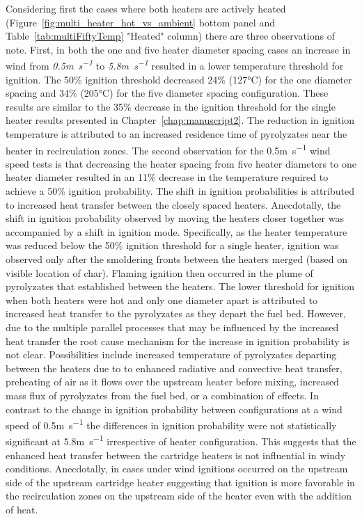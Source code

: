     Considering first the cases where both heaters are actively heated (Figure~\ref{fig:multi_heater_hot_vs_ambient} bottom panel and Table~\ref{tab:multiFiftyTemp} "Heated" column) there are three observations of note. First, in both the one and five heater diameter spacing cases an increase in wind from \textit{0.5\si{\meter\per\second}} to \textit{5.8\si{\meter\per\second}} resulted in a lower temperature threshold for ignition. The 50\% ignition threshold decreased 24\% (127\si{\celsius}) for the one diameter spacing and 34\% (205\si{\celsius}) for the five diameter spacing configuration. These results are similar to the 35\% decrease in the ignition threshold for the single heater results presented in Chapter~\ref{chap:manuscript2}. The reduction in ignition temperature is attributed to an increased residence time of pyrolyzates near the heater in recirculation zones. The second observation for the 0.5\si{\meter\per\second} wind speed tests is that decreasing the heater spacing from five heater diameters to one heater diameter resulted in an 11\% decrease in the temperature required to achieve a 50\% ignition probability. The shift in ignition probabilities is attributed to increased heat transfer between the closely spaced heaters. Anecdotally, the shift in ignition probability observed by moving the heaters closer together was accompanied by a shift in ignition mode. Specifically, as the heater temperature was reduced below the 50\% ignition threshold for a single heater, ignition was observed only after the smoldering fronts between the heaters merged (based on visible location of char). Flaming ignition then occurred in the plume of pyrolyzates that established between the heaters. The lower threshold for ignition when both heaters were hot and only one diameter apart is attributed to increased heat transfer to the pyrolyzates as they depart the fuel bed. However, due to the multiple parallel processes that may be influenced by the increased heat transfer the root cause mechanism for the increase in ignition probability is not clear.  Possibilities include increased temperature of pyrolyzates departing between the heaters due to to enhanced radiative and convective heat transfer, preheating of air as it flows over the upstream heater before mixing, increased mass flux of pyrolyzates from the fuel bed, or a combination of effects. In contrast to the change in ignition probability between configurations at a wind speed of 0.5\si{\meter\per\second} the differences in ignition probability were not statistically significant at 5.8\si{\meter\per\second} irrespective of heater configuration. This suggests that the enhanced heat transfer between the cartridge heaters is not influential in windy conditions. Anecdotally, in cases under wind ignitions occurred on the upstream side of the upstream cartridge heater suggesting that ignition is more favorable in the recirculation zones on the upstream side of the heater even with the addition of heat.
   
